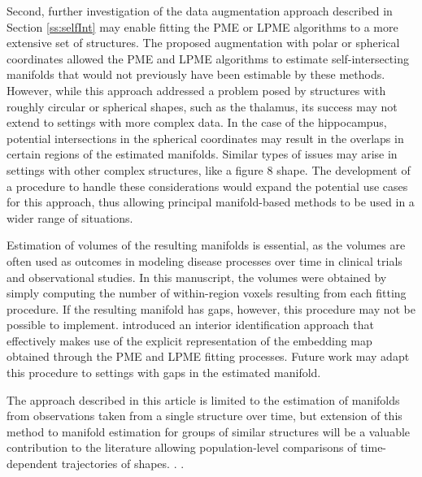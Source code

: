 \documentclass[12pt]{article}
\theoremstyle{definition}
\begin{document}
Second, further investigation of the  data augmentation approach described in Section \ref{ss:selfInt} may enable fitting the PME or LPME algorithms to a more extensive set of structures. The proposed augmentation with polar or spherical coordinates allowed the PME and LPME algorithms to estimate self-intersecting manifolds that would not previously have been estimable by these methods. However, while this approach addressed a problem posed by structures with roughly circular or spherical shapes, such as the thalamus, its success may not extend to settings with more complex data. In the case of the hippocampus, potential intersections in the spherical coordinates may result in the overlaps in certain regions of the estimated manifolds. Similar types of issues may arise in settings with other complex structures, like a figure 8 shape. The development of a procedure to handle these considerations would expand the potential use cases for this approach, thus allowing principal manifold-based methods to be used in a wider range of situations.

Estimation of volumes of the resulting manifolds is essential, as the volumes are often used as outcomes in modeling disease processes over time in clinical trials and observational studies. In this manuscript, the volumes were obtained by simply computing the number of within-region voxels resulting from each fitting procedure. If the resulting manifold has gaps, however, this procedure may not be possible to implement. \cite{meng2021Principal} introduced an interior identification approach that effectively makes use of the explicit representation of the embedding map obtained through the PME and LPME fitting processes. Future work may adapt this procedure to settings with gaps in the estimated manifold.

The approach described in this article is limited to the estimation of manifolds from observations taken from a single structure over time, but extension of this method to manifold estimation for groups of similar structures  will be a valuable contribution to the literature allowing population-level comparisons of time-dependent trajectories of shapes. . .
\end{document}
